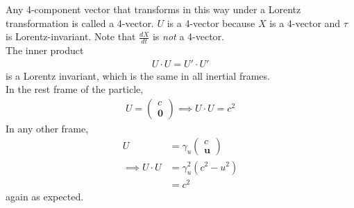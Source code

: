 \documentclass[a4paper]{article}
\begin{document}
Any 4-component vector that transforms in this way under a Lorentz transformation is called a 4-vector. $U$ is a 4-vector because $X$ is a 4-vector and $\tau$ is Lorentz-invariant. Note that $\frac{dX}{dt}$ is \emph{not} a 4-vector.\\

The inner product
\begin{equation*}
\begin{aligned}
U \cdot U = U' \cdot U'
\end{aligned}
\end{equation*}
is a Lorentz invariant, which is the same in all inertial frames.\\
In the rest frame of the particle,
\begin{equation*}
\begin{aligned}
U= \left(\begin{matrix}
c\\
\mathbf{0}
\end{matrix}\right) \implies U\cdot U = c^2
\end{aligned}
\end{equation*}
In any other frame,
\begin{equation*}
\begin{aligned}
U&=\gamma_u \left(\begin{matrix}
c\\
\mathbf{u}
\end{matrix}\right)\\
\implies U\cdot U &= \gamma_u^2 \left(c^2-u^2\right)\\
&= c^2
\end{aligned}
\end{equation*}
again as expected.
\end{document}
